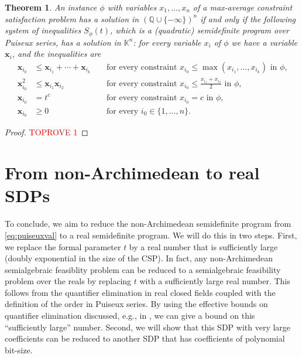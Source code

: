 \documentclass[11pt]{article}
\newtheorem{theorem}{Theorem}[section]
\theoremstyle{definition}
\theoremstyle{remark}
\newcommand{\Q}{\mathbb{Q}}
\newcommand{\puiseux}{\mathbb{K}}
\begin{document}
\begin{theorem}\label{nonarchSDP}
An instance $\phi$ with variables $x_1,\dots,x_n$ of a max-average constraint satisfaction problem has a solution in $(\Q \cup\{-\infty\})^n$
if and only if the following system of inequalities $S_\phi(t)$, which is a (quadratic) semidefinite program over Puiseux series, has a solution in $\puiseux^n$: 
for every variable $x_i$ of $\phi$ we have a variable $\bm{x}_i$, and the inequalities are 
\begin{equation}\label{eq:puiseuxval}
\begin{aligned}
\bm{x}_{i_0} &\le \bm{x}_{i_1} + \cdots + \bm{x}_{i_k} && \text{ for every constraint $x_{i_0} \leq \max(x_{i_1},\dots,x_{i_k})$ in $\phi$,} \\
\bm{x}^2_{i_0} &\le \bm{x}_{i_1}\bm{x}_{i_2} && \text{ for every constraint $x_{i_0} \le \frac{x_{i_1} + x_{i_2}}{2}$  in $\phi$,} \\
\bm{x}_{i_0} & = t^c && \text{ for every constraint $x_{i_0} = c$  in $\phi$,} \\
\bm{x}_{i_0} & \geq 0 && \text{ for every $i_0 \in \{1,\dots,n\}$.}
\end{aligned}
\end{equation}
\end{theorem}


\begin{proof}\textcolor{red}{TOPROVE 1}\end{proof}

\section{From non-Archimedean to real SDPs}

To conclude, we aim to reduce the non-Archimedean semidefinite program from \cref{eq:puiseuxval} to a real semidefinite program. 
We will do this in two steps. First, we replace the formal parameter $t$ by a real number that is sufficiently large (doubly exponential in the size of the CSP). In fact, any non-Archimedean semialgebraic feasiblity problem can be reduced to a semialgebraic feasibility problem over the reals by replacing $t$ with a sufficiently large real number. This follows 
from the quantifier elimination in real closed fields coupled with the definition of the order in Puiseux series. By using the effective bounds on quantifier elimination discussed, e.g., in \cite{basu_pollack_roy_algorithms}, we can give a bound on this ``sufficiently large'' number. Second, we will show that this SDP with very large coefficients can be reduced to another SDP that has coefficients of polynomial bit-size. 
\end{document}
